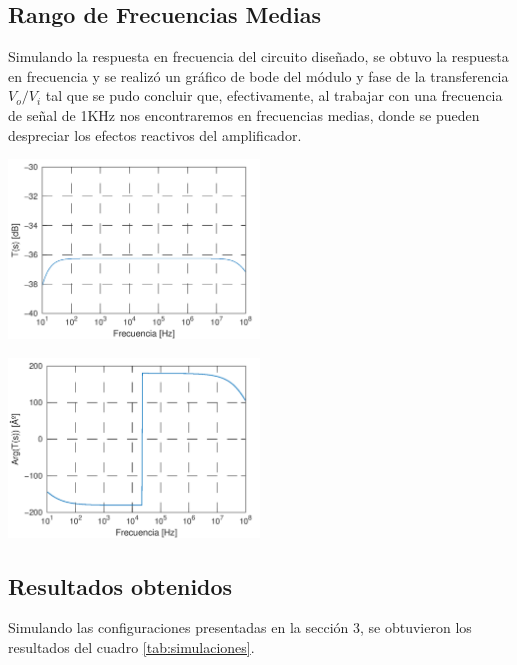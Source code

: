 \documentclass[a4paper, 10pt, spanish]{article}
\begin{document}
\subsection{Rango de Frecuencias Medias}

Simulando la respuesta en frecuencia del circuito diseñado, se obtuvo la respuesta en frecuencia y se realizó un gráfico de bode del módulo y fase de la transferencia $V_o/V_i$ tal que se pudo concluir que, efectivamente, al trabajar con una frecuencia de señal de 1KHz nos encontraremos en frecuencias medias, donde se pueden despreciar los efectos reactivos del amplificador.
\begin{center}
  \includegraphics[width=0.5\textwidth]{bode-a-mod.png}
  \label{fig:amp-mod-bode}
\end{center}

\begin{center}
  \includegraphics[width=0.5\textwidth]{bode-a-fase.png}
  \label{fig:amp-fase-bode}
\end{center}

\subsection{Resultados obtenidos}
Simulando las configuraciones presentadas en la sección 3, se obtuvieron los resultados del cuadro \ref{tab:simulaciones}.
\end{document}
